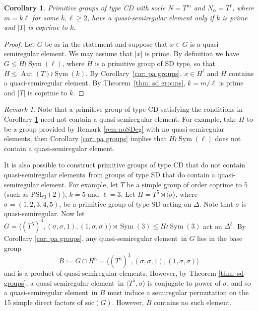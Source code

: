 \documentclass{article}
\newtheorem{cor}[thm]{Corollary}
\theoremstyle{remark}
\newtheorem{rem}[thm]{Remark}
\theoremstyle{definition}
\DeclareMathOperator{\Sym}{Sym}
\DeclareMathOperator{\Aut}{Aut}
\newcommand{\soc}{\mathrm{soc}}
\newcommand{\PSL}{\mathrm{PSL}}
\newcommand{\qsr}{quasi-semiregular}
\newcommand{\qsre}{quasi-semiregular element}
\newcommand{\qsres}{quasi-semiregular elements}
\begin{document}
\begin{cor}\label{cor:CD}
Primitive groups of type CD with socle $N=T^m$ and $N_\alpha = T^\ell$, where $m=k \ell$ for some $k,\ell\geqslant2$,  have a {\qsre}   only if $k$ is prime and   $|T|$ is coprime to $k$.
\end{cor}
\begin{proof}
Let $G$ be as in the statement and suppose that $x\in G$ is a {\qsre}. We may assume that $|x|$ is prime. By definition we have $G \leqslant H \wr \Sym(\ell)$, where $H$ is a primitive group of SD type, so that $H \leqslant \Aut(T) \wr \Sym(k)$. By Corollary~\ref{cor: pa groups},  $x\in H^{\ell}$ and $H$ contains a {\qsre}. By Theorem~\ref{thm: sd groups},  $k=m/\ell$ is prime and $|T|$ is coprime to $k$. 
\end{proof}


\begin{rem}
\label{rem:CDeg}
 Note that a primitive group of type CD satisfying the conditions in Corollary \ref{cor:CD} need not contain a \qsre. For example, take $H$ to be a group provided by Remark \ref{rem:noSDeg} with no \qsres, then Corollary \ref{cor: pa groups} implies that $H\wr \Sym(\ell)$ does not contain a \qsre.

It is also possible to construct primitive groups of type CD that do not contain \qsres\  from groups of type SD that do contain a \qsre. For example, let $T$ be a simple group of order coprime to 5 (such as $\PSL_3(2)$), $k=5$ and $\ell=3$. Let $H=T^5\rtimes \langle \sigma\rangle$, where $\sigma=(1,2,3,4,5)$, be a primitive group of type SD acting on $\Delta$. Note that $\sigma$ is \qsr. Now let $G= \langle (T^5)^3, (\sigma,\sigma,1), (1,\sigma,\sigma)\rangle \rtimes \Sym(3)\leqslant H\wr \Sym(3)$ act on $\Delta^3$.
 By Corollary \ref{cor: pa groups}, any \qsre\ in $G$ lies in the base group $$B:=G\cap H^3=\langle (T^5)^3, (\sigma,\sigma,1),(1,\sigma,\sigma)\rangle$$ and is a product of \qsres. However, by Theorem \ref{thm: sd groups}, a \qsre\ in $\langle T^5,\sigma\rangle$ is conjugate to power of $\sigma$, and so a \qsre\ in $B$ must induce a semiregular permutation on the 15 simple direct factors of $\soc(G)$. However, $B$ contains no such element.
\end{rem}
\end{document}
